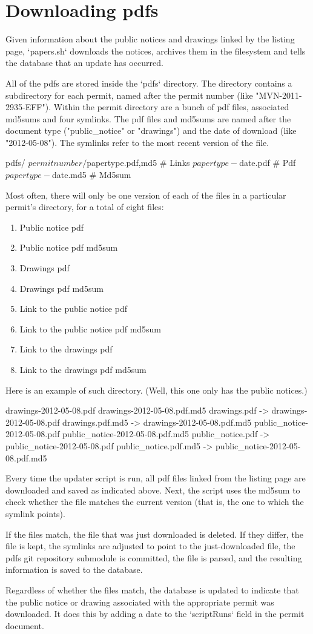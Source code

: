 \section{Downloading pdfs}
Given information about the public notices and drawings linked by the listing
page, `papers.sh` downloads the notices, archives them in the filesystem
and tells the database that an update has occurred.

All of the pdfs are stored inside the `pdfs` directory. The directory contains
a subdirectory for each permit, named after the permit number (like
"MVN-2011-2935-EFF"). Within the permit directory are a bunch of pdf files,
associated md5sums and four symlinks. The pdf files and md5sums are named
after the document type ("public_notice" or "drawings") and the date of download
(like "2012-05-08"). The symlinks refer to the most recent version of the file.

    pdfs/
      ${permitnumber}/
        ${papertype}.{pdf,md5} # Links
        ${papertype}-${date}.pdf # Pdf
        ${papertype}-${date}.md5 # Md5sum

Most often, there will only be one version of each of the files in a
particular permit's directory, for a total of eight files:
\begin{enumerate}
\item Public notice pdf
\item Public notice pdf md5sum
\item Drawings pdf
\item Drawings pdf md5sum
\item Link to the public notice pdf
\item Link to the public notice pdf md5sum
\item Link to the drawings pdf
\item Link to the drawings pdf md5sum
\end{enumerate}

Here is an example of such directory. (Well, this one only has the public
notices.)

    drawings-2012-05-08.pdf
    drawings-2012-05-08.pdf.md5
    drawings.pdf -> drawings-2012-05-08.pdf
    drawings.pdf.md5 -> drawings-2012-05-08.pdf.md5
    public_notice-2012-05-08.pdf
    public_notice-2012-05-08.pdf.md5
    public_notice.pdf -> public_notice-2012-05-08.pdf
    public_notice.pdf.md5 -> public_notice-2012-05-08.pdf.md5

Every time the updater script is run, all pdf files linked from the listing
page are downloaded and saved as indicated above. Next, the script uses the
md5sum to check whether the file matches the current version (that is, the
one to which the symlink points).

If the files match, the file that was just downloaded is deleted. If they
differ, the file is kept, the symlinks are adjusted to point to the
just-downloaded file, the pdfs git repository submodule is committed,
the file is parsed, and the resulting information is saved to the database.

Regardless of whether the files match, the database is updated to indicate
that the public notice or drawing associated with the appropriate permit
was downloaded. It does this by adding a date to the `scriptRuns` field
in the permit document.
